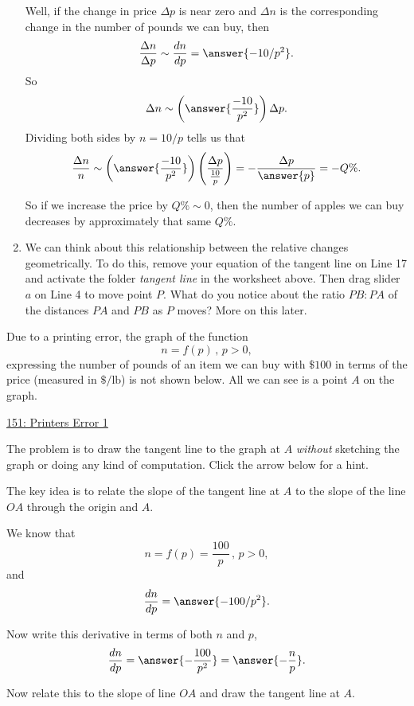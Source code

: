 \documentclass{ximera}
\begin{document}
\begin{question}
\begin{enumerate}
Well, if the change in price $\Delta p$ is near zero and $\Delta n$ is the corresponding change in the number of pounds we can buy, then 
\[
    \frac{\Delta n}{\Delta p}   \sim  \frac{dn}{dp} = \answer{-10/p^2}.
\]
So
\[
     \Delta n \sim \left( \answer{\frac{-10}{p^2}} \right) \Delta p.
\]
Dividing both sides by $n = 10/p$ tells us that
\[
        \frac{\Delta n}{n} \sim \left( \answer{\frac{-10}{p^2}} \right)\left( \frac{\Delta p}{\frac{10}{p}} \right) = -\frac{\Delta p}{\answer{p}} = -Q\%.
\]

So if we increase the price by $Q\%\sim 0$, then the number of apples we can buy decreases by approximately that same $Q\%$.

\item We can think about this relationship between the relative changes geometrically. To do this, remove your equation of the tangent line on Line 17 and activate the folder \emph{tangent line} in the worksheet above. Then drag slider $a$ on Line 4 to move point $P$. What do you notice about the ratio  $PB:PA$ of the distances $PA$ and $PB$ as $P$ moves? More on this later.

\end{enumerate}

\end{question}

\begin{question} \label{QGETGG3fg44}
Due to a printing error, the graph of the function
\[
      n = f(p)  \, , \, p>0 ,
\]
expressing the number of pounds of an item we can buy with $\$100$ in terms of the price (measured in $\$/\text{lb}$) is not shown below. All we can see is a point $A$ on the graph.

\begin{onlineOnly}
    \begin{center}
\end{center}
\end{onlineOnly}

\href{https://www.desmos.com/calculator/y5nqs8fkvj}{151: Printers Error 1}

The problem is to draw the tangent line to the graph at $A$ \emph{without} sketching the graph or doing any kind of computation. Click the arrow below for a hint.

\begin{expandable}
The key idea is to relate the slope of the tangent line at $A$ to the slope of the line $OA$ through the origin and $A$.


We know that
\[
      n = f(p)  = \frac{100}{p} \, , \, p>0 ,
\]
and
\[
 \frac{dn}{dp} =\answer{-100/p^2} .
\]

Now write this derivative in terms of both $n$ and $p$, 
\[
   \frac{dn}{dp} =\answer{-\frac{100}{p^2}} = \answer{-\frac{n}{p}} .
\]

Now relate this to the slope of line $OA$ and draw the tangent line at $A$.

\end{expandable}

\end{question}
\end{document}
